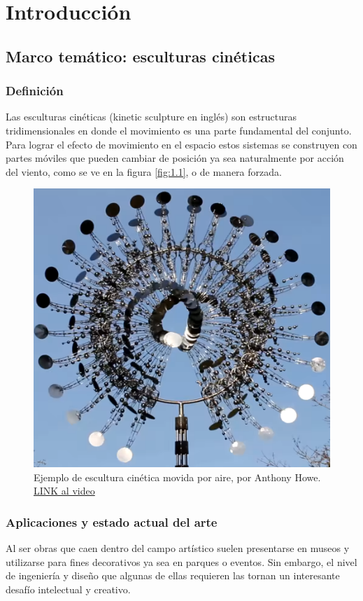 \chapter{Introducción}
\thispagestyle{empty}


\section{Marco temático: esculturas cinéticas}
\subsection{Definición}
Las esculturas cinéticas (kinetic sculpture en inglés) son estructuras tridimensionales en donde el movimiento es una parte fundamental del conjunto. Para lograr el efecto de movimiento en el espacio estos sistemas se construyen con partes móviles que pueden cambiar de posición ya sea naturalmente por acción del viento, como se ve en la figura \ref{fig:1.1}, o de manera forzada. \\

\begin{figure}[!ht]
	\centering
	\includegraphics[width=12cm,scale=1]{resources/4-kinSculp1.png}
	\caption{ Ejemplo de escultura cinética movida por aire, por Anthony Howe. \href{https://www.youtube.com/watch?v=N-1LpikCSR4}{LINK al video} }
	\label{fig:\thefigure}
\end{figure}

\subsection{Aplicaciones y estado actual del arte}
Al ser obras que caen dentro del campo artístico suelen presentarse en museos y utilizarse para fines decorativos ya sea en parques o eventos. Sin embargo, el nivel de ingeniería y diseño que algunas de ellas requieren las tornan un interesante desafío intelectual y creativo.\\


